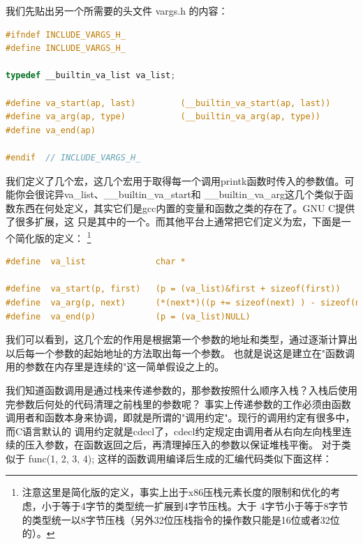 \par 我们先贴出另一个所需要的头文件 vargs.h 的内容：

\begin{lstlisting}[language = C, caption = include/vargs.h]
#ifndef INCLUDE_VARGS_H_
#define INCLUDE_VARGS_H_

typedef __builtin_va_list va_list;

#define va_start(ap, last)         (__builtin_va_start(ap, last))
#define va_arg(ap, type)           (__builtin_va_arg(ap, type))
#define va_end(ap) 

#endif 	// INCLUDE_VARGS_H_
\end{lstlisting}

\par 我们定义了几个宏，这几个宏用于取得每一个调用printk函数时传入的参数值。可能你会很诧异va\_list、\_\_builtin\_va\_start和\allowbreak
\_\_builtin\_va\_arg这几个类似于函数东西在何处定义，其实它们是gcc内置的变量和函数之类的存在了。GNU C提供了很多扩展，这\allowbreak
只是其中的一个。而其他平台上通常把它们定义为宏，下面是一个简化版的定义：\allowbreak
\footnote{注意这里是简化版的定义，事实上出于x86压栈元素长度的限制和优化的考虑，小于等于4字节的类型统一扩展到4字节压栈。大于\allowbreak
4字节小于等于8字节的类型统一以8字节压栈（另外32位压栈指令的操作数只能是16位或者32位的）。}

\begin{lstlisting}[language = C, caption = 可变形参表]
#define  va_list              char *

#define  va_start(p, first)   (p = (va_list)&first + sizeof(first))
#define  va_arg(p, next)      (*(next*)((p += sizeof(next) ) - sizeof(next)))
#define  va_end(p)            (p = (va_list)NULL)
\end{lstlisting}

\par 我们可以看到，这几个宏的作用是根据第一个参数的地址和类型，通过逐渐计算出以后每一个参数的起始地址的方法取出每一个参数。\allowbreak
也就是说这是建立在"函数调用的参数在内存里是连续的"这一简单假设之上的。

\par 我们知道函数调用是通过栈来传递参数的，那参数按照什么顺序入栈？入栈后使用完参数后何处的代码清理之前栈里的参数呢？\allowbreak
事实上传递参数的工作必须由函数调用者和函数本身来协调，即就是所谓的"调用约定"。现行的调用约定有很多中，而C语言默认的\allowbreak
调用约定就是cdecl了，cdecl约定规定由调用者从右向左向栈里连续的压入参数，在函数返回之后，再清理掉压入的参数以保证堆栈平衡。\allowbreak
对于类似于 func(1, 2, 3, 4); 这样的函数调用编译后生成的汇编代码类似下面这样：

